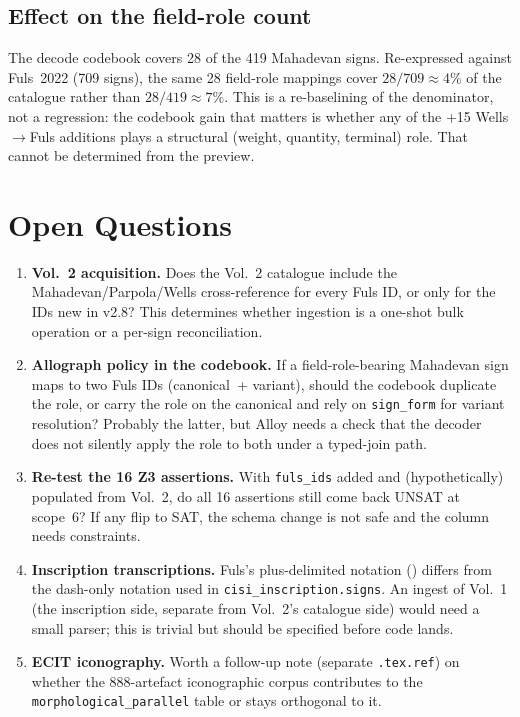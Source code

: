 \documentclass[12pt, a4paper]{article}
\newcommand{\inscr}[1]{\texttt{\seqsplit{#1}}}
\newcommand{\db}[1]{\texttt{#1}}
\begin{document}
\subsection{Effect on the field-role count}

The decode codebook covers 28 of the 419 Mahadevan signs.
Re-expressed against Fuls~2022 (709 signs), the same 28
field-role mappings cover $28/709 \approx 4\%$ of the
catalogue rather than $28/419 \approx 7\%$.  This is a
re-baselining of the denominator, not a regression: the
codebook gain that matters is whether any of the +15
Wells$\rightarrow$Fuls additions plays a structural
(weight, quantity, terminal) role.  That cannot be
determined from the preview.

\section{Open Questions}
\label{sec:open}

\begin{enumerate}[leftmargin=1.8em, itemsep=4pt]
\item \textbf{Vol.~2 acquisition.}\enspace
      Does the Vol.~2 catalogue include the
      Mahadevan/Parpola/Wells cross-reference for every
      Fuls ID, or only for the IDs new in v2.8?  This
      determines whether ingestion is a one-shot bulk
      operation or a per-sign reconciliation.
\item \textbf{Allograph policy in the codebook.}\enspace
      If a field-role-bearing Mahadevan sign maps to two
      Fuls IDs (canonical~+ variant), should the codebook
      duplicate the role, or carry the role on the canonical
      and rely on \db{sign\_form} for variant resolution?
      Probably the latter, but Alloy needs a check that the
      decoder does not silently apply the role to both
      under a typed-join path.
\item \textbf{Re-test the 16 Z3 assertions.}\enspace
      With \db{fuls\_ids} added and (hypothetically) populated
      from Vol.~2, do all 16 assertions still come back UNSAT
      at scope~6?  If any flip to SAT, the schema change is
      not safe and the column needs constraints.
\item \textbf{Inscription transcriptions.}\enspace
      Fuls's plus-delimited notation
      (\inscr{+a-b-c-+}) differs from the dash-only notation
      used in \db{cisi\_inscription.signs}.  An ingest of
      Vol.~1 (the inscription side, separate from Vol.~2's
      catalogue side) would need a small parser; this is
      trivial but should be specified before code lands.
\item \textbf{ECIT iconography.}\enspace
      Worth a follow-up note (separate \texttt{.tex.ref}) on
      whether the 888-artefact iconographic corpus contributes
      to the \db{morphological\_parallel} table or stays
      orthogonal to it.
\end{enumerate}
\end{document}
